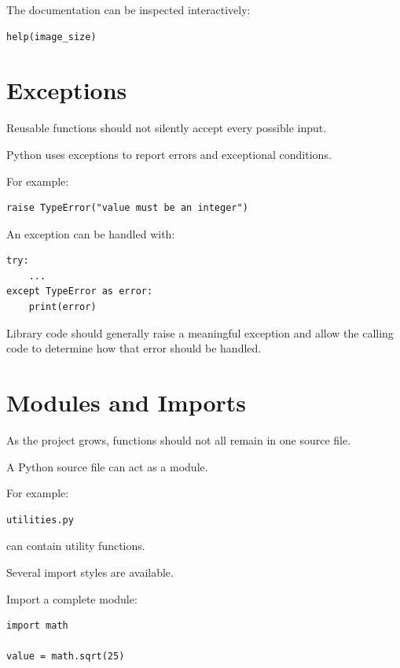 The documentation can be inspected interactively:

\begin{verbatim}
help(image_size)
\end{verbatim}


\section{Exceptions}
\label{sec:python-exceptions}

Reusable functions should not silently accept every possible input.

Python uses exceptions to report errors and exceptional conditions.

For example:

\begin{verbatim}
raise TypeError("value must be an integer")
\end{verbatim}

An exception can be handled with:

\begin{verbatim}
try:
    ...
except TypeError as error:
    print(error)
\end{verbatim}

Library code should generally raise a meaningful exception and allow
the calling code to determine how that error should be handled.


\section{Modules and Imports}
\label{sec:python-modules}

As the project grows, functions should not all remain in one source
file.

A Python source file can act as a module.

For example:

\begin{verbatim}
utilities.py
\end{verbatim}

can contain utility functions.

Several import styles are available.

Import a complete module:

\begin{verbatim}
import math

value = math.sqrt(25)
\end{verbatim}

